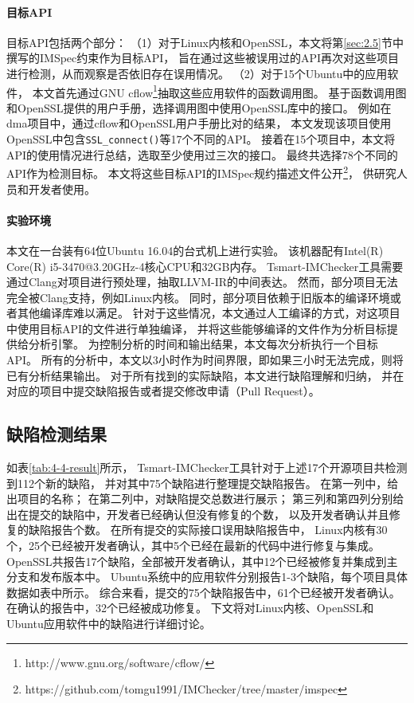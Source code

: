 \paragraph{目标API}
目标API包括两个部分：
（1）对于Linux内核和OpenSSL，本文将第\ref{sec:2.5}节中撰写的IMSpec约束作为目标API，
旨在通过这些被误用过的API再次对这些项目进行检测，从而观察是否依旧存在误用情况。
（2）对于15个Ubuntu中的应用软件，
本文首先通过GNU cflow\footnote{http://www.gnu.org/software/cflow/}抽取这些应用软件的函数调用图。
基于函数调用图和OpenSSL提供的用户手册，选择调用图中使用OpenSSL库中的接口。
例如在dma项目中，通过cflow和OpenSSL用户手册比对的结果，
本文发现该项目使用OpenSSL中包含\texttt{SSL\_connect()}等17个不同的API。
接着在15个项目中，本文将API的使用情况进行总结，选取至少使用过三次的接口。
最终共选择78个不同的API作为检测目标。
本文将这些目标API的IMSpec规约描述文件公开\footnote{https://github.com/tomgu1991/IMChecker/tree/master/imspec}，
供研究人员和开发者使用。




\paragraph{实验环境}
本文在一台装有64位Ubuntu 16.04的台式机上进行实验。
该机器配有Intel(R) Core(R) i5-3470@3.20GHz-4核心CPU和32GB内存。
Tsmart-IMChecker工具需要通过Clang对项目进行预处理，抽取LLVM-IR的中间表达。
然而，部分项目无法完全被Clang支持，例如Linux内核。
同时，部分项目依赖于旧版本的编译环境或者其他编译库难以满足。
针对于这些情况，本文通过人工编译的方式，对这项目中使用目标API的文件进行单独编译，
并将这些能够编译的文件作为分析目标提供给分析引擎。
为控制分析的时间和输出结果，本文每次分析执行一个目标API。
所有的分析中，本文以3小时作为时间界限，即如果三小时无法完成，则将已有分析结果输出。
对于所有找到的实际缺陷，本文进行缺陷理解和归纳，
并在对应的项目中提交缺陷报告或者提交修改申请（Pull Request）。

\subsection{缺陷检测结果}

如表\ref{tab:4-4-result}所示，
Tsmart-IMChecker工具针对于上述17个开源项目共检测到112个新的缺陷，
并对其中75个缺陷进行整理提交缺陷报告。
在第一列中，给出项目的名称；
在第二列中，对缺陷提交总数进行展示；
第三列和第四列分别给出在提交的缺陷中，开发者已经确认但没有修复的个数，
以及开发者确认并且修复的缺陷报告个数。
在所有提交的实际接口误用缺陷报告中，
Linux内核有30个，25个已经被开发者确认，其中5个已经在最新的代码中进行修复与集成。
OpenSSL共报告17个缺陷，全部被开发者确认，其中12个已经被修复并集成到主分支和发布版本中。
Ubuntu系统中的应用软件分别报告1-3个缺陷，每个项目具体数据如表中所示。
综合来看，提交的75个缺陷报告中，61个已经被开发者确认。
在确认的报告中，32个已经被成功修复。
下文将对Linux内核、OpenSSL和Ubuntu应用软件中的缺陷进行详细讨论。

